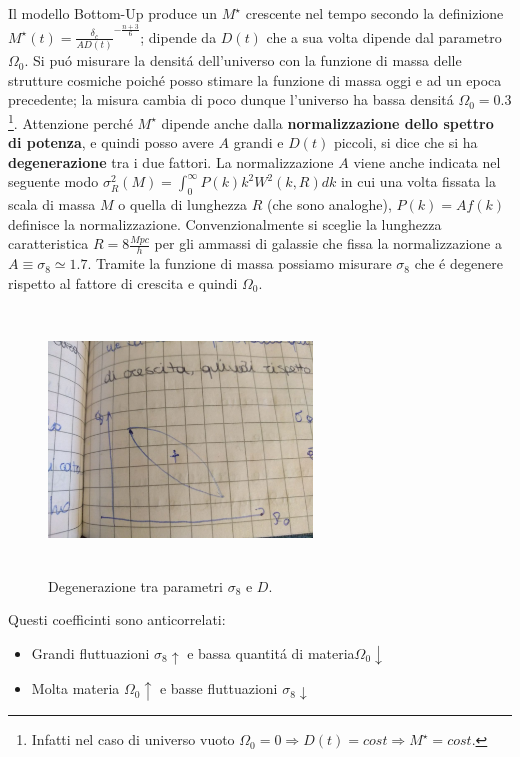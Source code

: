 \documentclass[12pt, a4paper]{article}
\begin{document}
Il modello Bottom-Up produce un $M^{\star}$ crescente nel tempo secondo la definizione $M^{\star}(t)=\frac{\delta_c}{AD(t)}^{-\frac{n+3}{6}}$; dipende da  $D(t)$ che a sua volta dipende dal parametro $\Omega_0$. Si pu\'{o} misurare la densit\'{a} dell'universo con la funzione di massa delle strutture cosmiche poich\'{e} posso stimare la funzione di massa oggi e ad un epoca precedente; la misura cambia di poco dunque l'universo ha bassa densit\'{a} $\Omega_0=0.3$ \footnote{Infatti nel caso di universo vuoto $\Omega_0=0\Rightarrow D(t)=cost \Rightarrow M^{\star} =cost$.}. Attenzione perch\'{e} $M^{\star}$ dipende anche dalla \textbf{normalizzazione dello spettro di potenza}, e quindi posso avere $A$ grandi e $D(t)$ piccoli, si dice che si ha \textbf{degenerazione} tra i due fattori. La normalizzazione $A$ viene anche indicata nel seguente modo $\sigma^2_R(M)=\int_0^{\infty}P(k) k^2W^2(k,R)dk$ in cui una volta fissata la scala di massa $M$ o quella di lunghezza $R$ (che sono analoghe), $P(k)=Af(k)$ definisce la normalizzazione. Convenzionalmente si sceglie la lunghezza caratteristica $R=8\frac{Mpc}{h}$ per gli ammassi di galassie che fissa la normalizzazione a $A \equiv \sigma_{8}\simeq
1.7$. Tramite la funzione di massa possiamo misurare $\sigma_8$ che \'{e} degenere rispetto al fattore di crescita e quindi $\Omega_0$.
\begin{figure}[htp]
\centering
\includegraphics[width=7cm, height=7cm]{images/degSD.jpeg}
\caption{Degenerazione tra parametri $\sigma_8$ e $D$.}
\label{fig:degSD}
\end{figure}
Questi coefficinti sono anticorrelati:
\begin{itemize}
\item Grandi fluttuazioni $\sigma_8 \uparrow$ e bassa quantit\'{a} di materia$\Omega_0 \downarrow$
\item Molta materia $\Omega_0 \uparrow$ e basse fluttuazioni $\sigma_8 \downarrow$
\end{itemize}
\end{document}
